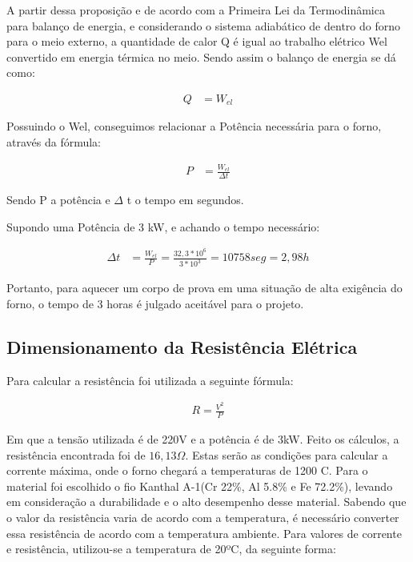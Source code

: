 A partir dessa proposição e de acordo com a Primeira Lei da Termodinâmica para balanço de energia, e considerando o sistema adiabático de dentro do forno para o meio externo, a quantidade de calor Q é igual ao trabalho elétrico Wel convertido em energia térmica no meio. Sendo assim o balanço de energia se dá como:

\begin{align}
Q &= W_{el}
\end{align}

Possuindo o Wel, conseguimos relacionar a Potência necessária para o forno, através da fórmula:

\begin{align}
P &= \frac{W_{el}}{\Delta t}
\end{align}

Sendo P a potência e $\Delta$ t o tempo em segundos. 

Supondo uma Potência de 3 kW, e achando o tempo necessário:

\begin{align}
\Delta t &= \frac{W_{el}}{P} = \frac{32,3*10^6}{3*10^3} = 10758seg = 2,98h
\end{align}

Portanto, para aquecer um corpo de prova em uma situação de alta exigência do forno, o tempo de 3 horas é julgado aceitável para o projeto.

\subsection{Dimensionamento da Resistência Elétrica}

Para calcular a resistência foi utilizada a seguinte fórmula:

\begin{align}
R = \frac{V^2}{P}
\end{align}

Em que a tensão utilizada é de 220V e a potência é de 3kW. Feito os cálculos, a resistência encontrada foi de $16,13 \Omega$. Estas serão as condições para calcular a corrente máxima, onde o forno chegará a temperaturas de 1200 C. Para o material foi escolhido o fio Kanthal A-1(Cr 22\%, Al 5.8\% e Fe 72.2\%), levando em consideração a durabilidade e o alto desempenho desse material. Sabendo que o valor da resistência varia de acordo com a temperatura, é necessário converter essa resistência de acordo com a temperatura ambiente. Para valores de corrente e resistência, utilizou-se a temperatura de 20ºC, da seguinte forma:

